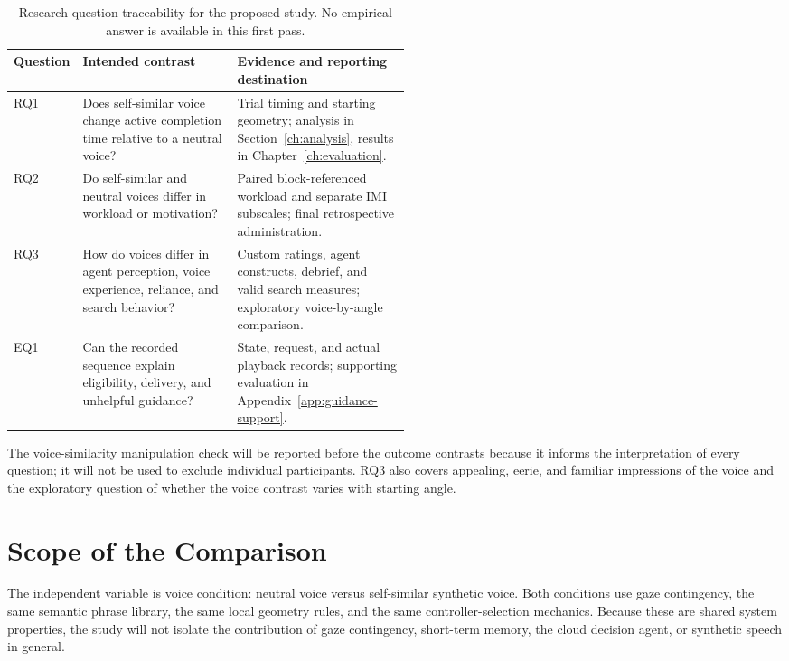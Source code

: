 \begin{table}[htbp]\centering
\caption[Research questions and evidence requirements]{Research-question traceability for the proposed study. No empirical answer is available in this first pass.}
\label{tab:rq-map}
\small{}
\begin{tabularx}{\linewidth}{@{}p{0.12\linewidth}p{0.39\linewidth}X@{}}\toprule
Question & Intended contrast & Evidence and reporting destination \\\midrule
RQ1 & Does self-similar voice change active completion time relative to a neutral voice? & Trial timing and starting geometry; analysis in Section~\ref{ch:analysis}, results in Chapter~\ref{ch:evaluation}. \\
RQ2 & Do self-similar and neutral voices differ in workload or motivation? & Paired block-referenced workload and separate IMI subscales; final retrospective administration. \\
RQ3 & How do voices differ in agent perception, voice experience, reliance, and search behavior? & Custom ratings, agent constructs, debrief, and valid search measures; exploratory voice-by-angle comparison. \\
EQ1 & Can the recorded sequence explain eligibility, delivery, and unhelpful guidance? & State, request, and actual playback records; supporting evaluation in Appendix~\ref{app:guidance-support}. \\\bottomrule
\end{tabularx}
\end{table}

The voice-similarity manipulation check will be reported before the outcome contrasts because it informs the interpretation of every question; it will not be used to exclude individual participants. RQ3 also covers appealing, eerie, and familiar impressions of the voice and the exploratory question of whether the voice contrast varies with starting angle.

\section{Scope of the Comparison}
The independent variable is voice condition: neutral voice versus self-similar synthetic voice. Both conditions use gaze contingency, the same semantic phrase library, the same local geometry rules, and the same controller-selection mechanics. Because these are shared system properties, the study will not isolate the contribution of gaze contingency, short-term memory, the cloud decision agent, or synthetic speech in general.

